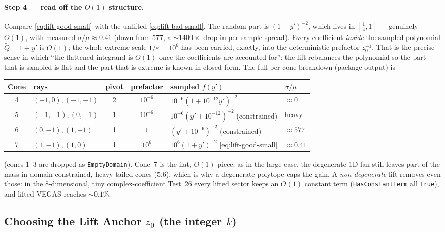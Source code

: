 \documentclass[11pt,a4paper]{article}
\begin{document}
\paragraph{Step 4 --- read off the $O(1)$ structure.}
Compare \eqref{eq:lift-good-small} with the unlifted \eqref{eq:lift-bad-small}.
The random part is $(1+y')^{-2}$, which lives in $[\tfrac14,1]$ --- genuinely
$O(1)$, with measured $\sigma/\mu \approx 0.41$ (down from $577$, a
$\sim\!1400\times$ drop in per-sample spread). Every coefficient \emph{inside} the
sampled polynomial $\tilde Q = 1+y'$ is $O(1)$; the whole extreme scale
$1/\varepsilon = 10^{6}$ has been carried, exactly, into the deterministic
prefactor $z_0^{-1}$. That is the precise sense in which ``the flattened integrand
is $O(1)$ once the coefficients are accounted for'': the lift rebalances the
polynomial so the part that is sampled is flat and the part that is extreme is
known in closed form. The full per-cone breakdown (package output) is

\begin{center}\small
\setlength{\tabcolsep}{5pt}
\begin{tabular}{clccll}
\toprule
Cone & rays & pivot & prefactor & sampled $f(y')$ & $\sigma/\mu$ \\
\midrule
4 & $(-1,0),(-1,-1)$ & 2 & $10^{-6}$ & $10^{-6}(1+10^{-12}y')^{-2}$ & $\approx 0$ \\
5 & $(-1,-1),(0,-1)$ & 1 & $10^{-6}$ & $10^{-6}(y'+10^{-12})^{-2}$ (constrained) & heavy \\
6 & $(0,-1),(1,-1)$  & 1 & $1$       & $(y'+10^{-6})^{-2}$ (constrained)        & $\approx 577$ \\
7 & $(1,-1),(1,0)$   & 1 & $10^{6}$  & $10^{6}(1+y')^{-2}$ \eqref{eq:lift-good-small} & $\approx 0.41$ \\
\bottomrule
\end{tabular}
\end{center}
(cones $1$--$3$ are dropped as \texttt{EmptyDomain}). Cone~7 is the flat,
$O(1)$ piece; as in the large case, the degenerate 1D fan still leaves part of the
mass in domain-constrained, heavy-tailed cones (5,6), which is why a degenerate
polytope caps the gain. A \emph{non-degenerate} lift removes even those: in the
8-dimensional, tiny complex-coefficient Test~26 every lifted sector keeps an
$O(1)$ constant term (\texttt{HasConstantTerm} all \texttt{True}), and lifted
VEGAS reaches $\sim\!0.1\%$.

\subsection{Choosing the Lift Anchor \texorpdfstring{$z_0$}{z0} (the integer \texorpdfstring{$k$}{k})}\label{sec:anchor}
\end{document}
